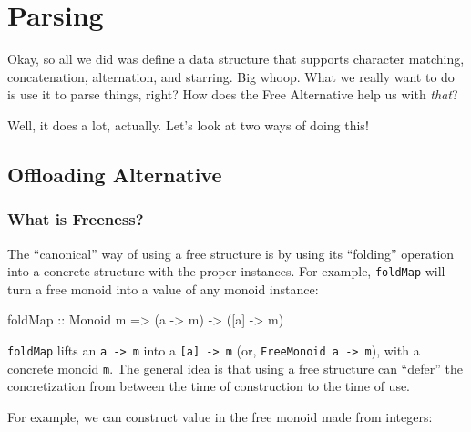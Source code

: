 \documentclass[]{article}
\newenvironment{Shaded}{}{}
\newcommand{\DataTypeTok}[1]{\textcolor[rgb]{0.56,0.13,0.00}{#1}}
\newcommand{\FunctionTok}[1]{\textcolor[rgb]{0.02,0.16,0.49}{#1}}
\newcommand{\NormalTok}[1]{#1}
\newcommand{\OtherTok}[1]{\textcolor[rgb]{0.00,0.44,0.13}{#1}}
\begin{document}
\hypertarget{parsing}{%
\section{Parsing}\label{parsing}}

Okay, so all we did was define a data structure that supports character
matching, concatenation, alternation, and starring. Big whoop. What we really
want to do is use it to parse things, right? How does the Free Alternative help
us with \emph{that}?

Well, it does a lot, actually. Let's look at two ways of doing this!

\hypertarget{offloading-alternative}{%
\subsection{Offloading Alternative}\label{offloading-alternative}}

\hypertarget{what-is-freeness}{%
\subsubsection{What is Freeness?}\label{what-is-freeness}}

The ``canonical'' way of using a free structure is by using its ``folding''
operation into a concrete structure with the proper instances. For example,
\texttt{foldMap} will turn a free monoid into a value of any monoid instance:

\begin{Shaded}
\begin{Highlighting}[]
\FunctionTok{foldMap}\OtherTok{ ::} \DataTypeTok{Monoid}\NormalTok{ m }\OtherTok{=>}\NormalTok{ (a }\OtherTok{{-}>}\NormalTok{ m) }\OtherTok{{-}>}\NormalTok{ ([a] }\OtherTok{{-}>}\NormalTok{ m)}
\end{Highlighting}
\end{Shaded}

\texttt{foldMap} lifts an \texttt{a\ -\textgreater{}\ m} into a
\texttt{{[}a{]}\ -\textgreater{}\ m} (or,
\texttt{FreeMonoid\ a\ -\textgreater{}\ m}), with a concrete monoid \texttt{m}.
The general idea is that using a free structure can ``defer'' the concretization
from between the time of construction to the time of use.

For example, we can construct value in the free monoid made from integers:
\end{document}
